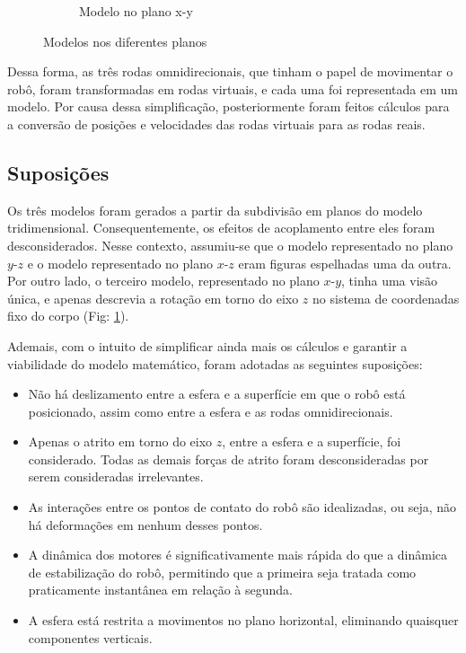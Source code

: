 \begin{figure}[H]
\begin{subfigure}[b]{0.4\textwidth}
        \caption{Modelo no plano x-y}
        \label{fig:modelo_xy}
    \end{subfigure}
    \caption{Modelos nos diferentes planos}
    \label{fig:modelos_planos}
\end{figure}

Dessa forma, as três rodas omnidirecionais, que tinham o papel de movimentar o robô, foram transformadas em rodas virtuais, e cada uma foi representada em um modelo. Por causa dessa simplificação, posteriormente foram feitos cálculos para a conversão de posições e velocidades das rodas virtuais para as rodas reais.

\subsection{Suposições}

Os três modelos foram gerados a partir da subdivisão em planos do modelo tridimensional. Consequentemente, os efeitos de acoplamento entre eles foram desconsiderados. Nesse contexto, assumiu-se que o modelo representado no plano $y$-$z$ e o modelo representado no plano $x$-$z$ eram figuras espelhadas uma da outra. Por outro lado, o terceiro modelo, representado no plano $x$-$y$, tinha uma visão única, e apenas descrevia a rotação em torno do eixo \( z \) no sistema de coordenadas fixo do corpo (Fig: \ref{fig:modelo_xy}).

Ademais, com o intuito de simplificar ainda mais os cálculos e garantir a viabilidade do modelo matemático, foram adotadas as seguintes suposições:

\begin{itemize}
    \item Não há deslizamento entre a esfera e a superfície em que o robô está posicionado, assim como entre a esfera e as rodas omnidirecionais.
    \item Apenas o atrito em torno do eixo $z$, entre a esfera e a superfície, foi considerado. Todas as demais forças de atrito foram desconsideradas por serem consideradas irrelevantes.
    \item As interações entre os pontos de contato do robô são idealizadas, ou seja, não há deformações em nenhum desses pontos.
    \item A dinâmica dos motores é significativamente mais rápida do que a dinâmica de estabilização do robô, permitindo que a primeira seja tratada como praticamente instantânea em relação à segunda.
    \item A esfera está restrita a movimentos no plano horizontal, eliminando quaisquer componentes verticais.
\end{itemize}

